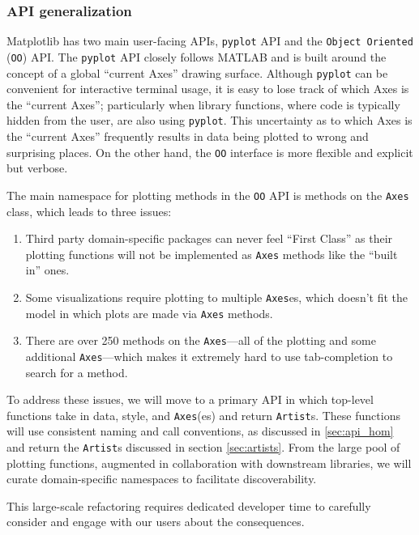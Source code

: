 \documentclass[11pt,letterpaper]{article}  %
\begin{document}
\subsubsection{API generalization}
\label{sec:api_gen}
Matplotlib has two main user-facing APIs, \texttt{pyplot} API 
and the \texttt{Object Oriented} (\texttt{OO})
API.  The \texttt{pyplot} API closely follows MATLAB and is built
around the concept of a global ``current Axes'' drawing surface.
Although \texttt{pyplot} can be convenient for interactive terminal
usage, it is easy to lose track of which Axes is the ``current Axes''; 
particularly when library functions, where code is typically hidden
from the user, are also using \texttt{pyplot}.
This uncertainty as to which Axes is the ``current Axes'' frequently results in data being
plotted to wrong and surprising places. On the other hand, the \texttt{OO} interface is more flexible and
explicit but verbose.

The main namespace for plotting methods in the \texttt{OO} API is
methods on the \texttt{Axes} class, which leads to three issues:
\begin{enumerate}
\item Third party domain-specific packages can never feel ``First
Class'' as their plotting functions will not be implemented as
\texttt{Axes} methods like the ``built in'' ones. 
\item Some visualizations require plotting to multiple \texttt{Axes}es, which 
doesn't fit the model in which plots are made via \texttt{Axes} methods.
\item There are over 250 methods on the \texttt{Axes}---all of the
plotting and some additional \texttt{Axes}---which makes it extremely hard to use tab-completion to
search for a method.
\end{enumerate}

To address these issues, we will move to a primary API in which
top-level functions take in data, style, and \texttt{Axes}(es) and
return \texttt{Artist}s.  These functions will use consistent naming
and call conventions, as discussed in \ref{sec:api_hom} and return the
\texttt{Artist}s discussed in section \ref{sec:artists}. From the
large pool of plotting functions, augmented in collaboration with
downstream libraries, we will curate domain-specific namespaces to
facilitate discoverability.

This large-scale refactoring requires dedicated developer time to
carefully consider and engage with our users about the consequences.
\end{document}
